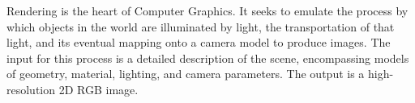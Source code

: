 Rendering is the heart of Computer Graphics. It seeks to emulate the process by which objects in the world are illuminated by light, the transportation of that light, and its eventual mapping onto a camera model to produce images. The input for this process is a detailed description of the scene, encompassing models of geometry, material, lighting, and camera parameters. The output is a high-resolution 2D RGB image.
